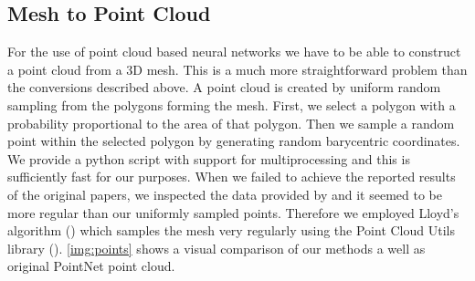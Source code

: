\subsection{Mesh to Point Cloud}
For the use of point cloud based neural networks we have to be able to construct a point cloud from a 3D mesh. This is a much more straightforward problem than the conversions described above. A point cloud is created by uniform random sampling from the polygons forming the mesh. First, we select a polygon with a probability proportional to the area of that polygon. Then we sample a random point within the selected polygon by generating random barycentric coordinates. We provide a python script with support for multiprocessing and this is sufficiently fast for our purposes. When we failed to achieve the reported results of the original papers, we inspected the data provided by \cite{qi_pointnet_2016} and it seemed to be more regular than our uniformly sampled points. Therefore we employed Lloyd's algorithm (\cite{lloyd_least_1982}) which samples the mesh very regularly using the Point Cloud Utils library (\cite{williams_point_2019}). \autoref{img:points} shows a visual comparison of our methods a well as original PointNet point cloud.

